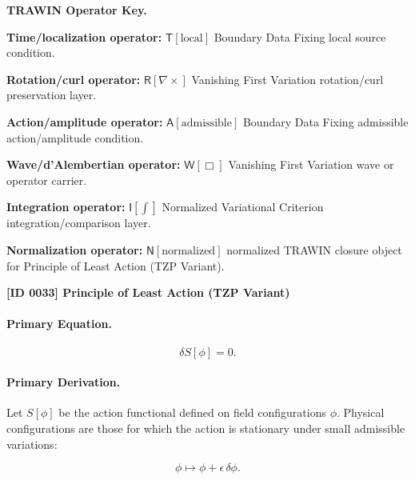 \par\vspace{0.45\baselineskip}
\noindent\begin{minipage}[t]{\linewidth}
\begingroup
\small
\raggedright
\textbf{TRAWIN Operator Key.}\par
\noindent\textbf{Time/localization operator:} $\mathsf{T}\!\left[\mathrm{local}\right]$ Boundary Data Fixing local source condition.\par
\noindent\textbf{Rotation/curl operator:} $\mathsf{R}\!\left[\nabla\times\right]$ Vanishing First Variation rotation/curl preservation layer.\par
\noindent\textbf{Action/amplitude operator:} $\mathsf{A}\!\left[\mathrm{admissible}\right]$ Boundary Data Fixing admissible action/amplitude condition.\par
\noindent\textbf{Wave/d'Alembertian operator:} $\mathsf{W}\!\left[\Box\right]$ Vanishing First Variation wave or operator carrier.\par
\noindent\textbf{Integration operator:} $\mathsf{I}\!\left[\int\right]$ Normalized Variational Criterion integration/comparison layer.\par
\noindent\textbf{Normalization operator:} $\mathsf{N}\!\left[\mathrm{normalized}\right]$ normalized TRAWIN closure object for Principle of Least Action (TZP Variant).\par
\endgroup
\end{minipage}

\clearpage
\noindent\textbf{[ID 0033] Principle of Least Action (TZP Variant)}\par
\vspace{0.35em}
\paragraph{Primary Equation.}
\begin{equation}
\delta S[\phi]=0 .
\end{equation}

\paragraph{Primary Derivation.}
Let $S[\phi]$ be the action functional defined on field configurations $\phi$.  
Physical configurations are those for which the action is stationary under small admissible variations:

\begin{equation}
\phi \mapsto \phi+\epsilon\,\delta\phi .
\end{equation}

